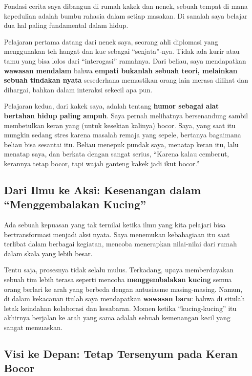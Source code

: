 \documentclass[
  letterpaper,
  DIV=11,
  numbers=noendperiod]{scrreprt}
\begin{document}
Fondasi cerita saya dibangun di rumah kakek dan nenek, sebuah tempat di
mana kepedulian adalah bumbu rahasia dalam setiap masakan. Di sanalah
saya belajar dua hal paling fundamental dalam hidup.

Pelajaran pertama datang dari nenek saya, seorang ahli diplomasi yang
menggunakan teh hangat dan kue sebagai ``senjata''-nya. Tidak ada kurir
atau tamu yang bisa lolos dari ``interogasi'' ramahnya. Dari beliau,
saya mendapatkan \textbf{wawasan mendalam} bahwa \textbf{empati bukanlah
sebuah teori, melainkan sebuah tindakan nyata} sesederhana memastikan
orang lain merasa dilihat dan dihargai, bahkan dalam interaksi sekecil
apa pun.

Pelajaran kedua, dari kakek saya, adalah tentang \textbf{humor sebagai
alat bertahan hidup paling ampuh}. Saya pernah melihatnya bersenandung
sambil membetulkan keran yang (untuk kesekian kalinya) bocor. Saya, yang
saat itu mungkin sedang stres karena masalah remaja yang sepele,
bertanya bagaimana beliau bisa sesantai itu. Beliau menepuk pundak saya,
menatap keran itu, lalu menatap saya, dan berkata dengan sangat serius,
``Karena kalau cemberut, kerannya tetap bocor, tapi wajah ganteng kakek
jadi ikut bocor.''

\subsection{Dari Ilmu ke Aksi: Kesenangan dalam ``Menggembalakan
Kucing''}\label{dari-ilmu-ke-aksi-kesenangan-dalam-menggembalakan-kucing}

Ada sebuah kepuasan yang tak ternilai ketika ilmu yang kita pelajari
bisa bertransformasi menjadi aksi nyata. Saya menemukan kebahagiaan itu
saat terlibat dalam berbagai kegiatan, mencoba menerapkan nilai-nilai
dari rumah dalam skala yang lebih besar.

Tentu saja, prosesnya tidak selalu mulus. Terkadang, upaya memberdayakan
sebuah tim lebih terasa seperti mencoba \textbf{menggembalakan kucing}
semua orang berlari ke arah yang berbeda dengan antusiasme
masing-masing. Namun, di dalam kekacauan itulah saya mendapatkan
\textbf{wawasan baru}: bahwa di situlah letak keindahan kolaborasi dan
kesabaran. Momen ketika ``kucing-kucing'' itu akhirnya berjalan ke arah
yang sama adalah sebuah kemenangan kecil yang sangat memuaskan.

\subsection{Visi ke Depan: Tetap Tersenyum pada Keran
Bocor}\label{visi-ke-depan-tetap-tersenyum-pada-keran-bocor}
\end{document}
